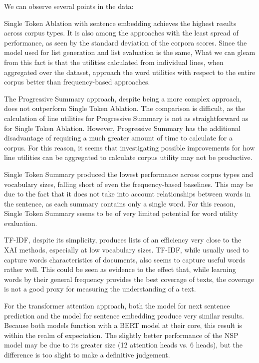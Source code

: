 We can observe several points in the data:

Single Token Ablation with sentence embedding achieves the highest results across corpus types.
It is also among the approaches with the least spread of performance, as seen by the standard deviation of the corpora scores.
Since the model used for list generation and list evaluation is the same,
What we can gleam from this fact is that the utilities calculated from individual lines, when aggregated over the dataset, approach the word utilities with respect to the entire corpus better than frequency-based approaches.

The Progressive Summary approach, despite being a more complex approach, does not outperform Single Token Ablation.
The comparison is difficult, as the calculation of line utilities for Progressive Summary is not as straightforward as for Single Token Ablation.
However, Progressive Summary has the additional disadvantage of requiring a much greater amount of time to calculate for a corpus.
For this reason, it seems that investigating possible improvements for how line utilities can be aggregated to calculate corpus utility may not be productive.

Single Token Summary produced the lowest performance across corpus types and vocabulary sizes, falling short of even the frequency-based baselines.
This may be due to the fact that it does not take into account relationships between words in the sentence, as each summary contains only a single word.
For this reason, Single Token Summary seems to be of very limited potential for word utility evaluation.

TF-IDF, despite its simplicity, produces lists of an efficiency very close to the XAI methods, especially at low vocabulary sizes.
TF-IDF, while usually used to capture words characteristics of documents, also seems to capture useful words rather well.
This could be seen as evidence to the effect that, while learning words by their general frequency provides the best coverage of texts, the coverage is not a good proxy for measuring the understanding of a text.


For the transformer attention approach, both the model for next sentence prediction and the model for sentence embedding produce very similar results.
Because both models function with a BERT model at their core, this result is within the realm of expectation.
The slightly better performance of the NSP model may be due to its greater size (12 attention heads vs. 6 heads), but the difference is too slight to make a definitive judgement.

